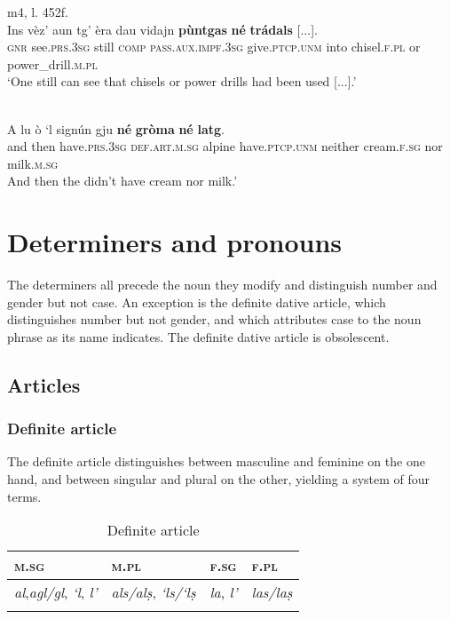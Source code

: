\ea

 {m4, l. 452f.}\\
\gll Ins vèz’ aun tg’ èra dau vidajn \textbf{pùntgas} \textbf{né} \textbf{trádals} [...].\\
\textsc{gnr} see.\textsc{prs.3sg} still \textsc{comp} \textsc{pass.aux.impf.3sg} give.\textsc{ptcp.unm} into chisel.\textsc{f.pl} or power\_drill.\textsc{m.pl}\\
\glt `One still can see that chisels or power drills had been used [...].'
\z

\ea

\\
\gll A lu ò `l signún gju \textbf{né} \textbf{gròma} \textbf{né} \textbf{latg}.\\
and then have.\textsc{prs.3sg} \textsc{def.art.m.sg} alpine have.\textsc{ptcp.unm} neither cream.\textsc{f.sg} nor milk.\textsc{m.sg}\\
\glt And then the didn't have cream nor milk.'
\z


\section{Determiners and pronouns}
The determiners all precede the noun they modify and distinguish number and gender but not case. An exception is the definite dative article, which distinguishes number but not gender, and which attributes case to the noun phrase as its name indicates. The definite dative article is obsolescent.

\subsection{Articles}

\subsubsection{Definite article}
The definite article distinguishes between masculine and feminine on the one hand, and between singular and plural on the other, yielding a system of four terms.

\begin{table}
\caption{Definite article}
\label{tab:1:defart}
 \begin{tabular}{llll}
  \lsptoprule
   \textsc{m.sg}   &  \textsc{m.pl} & \textsc{f.sg} & \textsc{f.pl}\\ 
  \midrule
  \textit{al},\textit{agl/gl}, \textit{`l}, \textit{l'} & \textit{als/alṣ}, \textit{`ls/`lṣ} & \textit{la}, \textit{l'} &  \textit{las/laṣ}\\
\lspbottomrule
\end{tabular}
\end{table}

